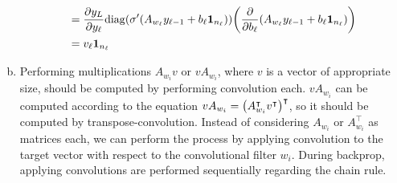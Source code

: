 \documentclass[10pt]{article}
\begin{document}
\begin{enumerate}[(a)]
\begin{align*}
        &= \frac{\partial y_L}{\partial y_\ell}\mathrm{diag}\qty(\sigma'\qty(A_{w_\ell}y_{\ell-1} + b_\ell\mathbf{1}_{n_\ell}))\qty(\frac{\partial}{\partial b_\ell}\qty(A_{w_\ell}y_{\ell-1} + b_\ell\mathbf{1}_{n_\ell})) \\
        &= v_\ell\mathbf{1}_{n_\ell}
    \end{align*}
    \item Performing multiplications $A_{w_i}v$ or $vA_{w_i}$, where $v$ is a vector of appropriate size, should be computed by performing convolution each.
    $vA_{w_i}$ can be computed according to the equation $vA_{w_i} = \qty(A_{w_i}^\intercal v^\intercal)^\intercal$, so it should be computed by transpose-convolution.
    Instead of considering $A_{w_i}$ or $A_{w_i}^\intercal$ as matrices each, we can perform the process by applying convolution to the target vector with respect to the convolutional filter $w_i$.
    During backprop, applying convolutions are performed sequentially regarding the chain rule.
\end{enumerate}
\end{document}
